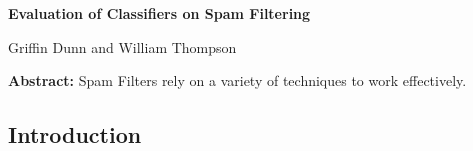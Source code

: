 \documentclass[12pt]{article}
\begin{document}
    \begin{center}
        \textbf{Evaluation of Classifiers on Spam Filtering} 
    \end{center}

    \begin{center}
        Griffin Dunn and William Thompson
    \end{center}

    \textbf{Abstract:} Spam Filters rely on a variety of techniques to work effectively.

    \begin{multicols}{2}
        \section{Introduction}
    \end{multicols}
 
\end{document}
